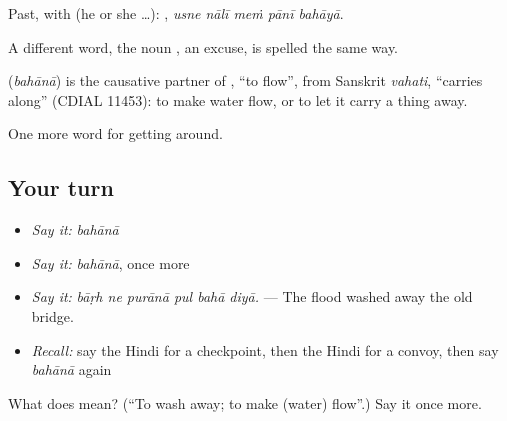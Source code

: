 Past, with  (he or she …):     , \emph{usne nālī meṁ pānī bahāyā}.

A different word, the noun , an excuse, is spelled the same way.

\begin{cousinweb}
\textbf{} (\emph{bahānā}) is the causative partner of , \textquotedblleft{}to flow\textquotedblright{}, from Sanskrit \emph{vahati}, \textquotedblleft{}carries along\textquotedblright{} (CDIAL 11453): to make water flow, or to let it carry a thing away.
\end{cousinweb}

\begin{grammarlens}[title={What you've built}]
One more word for getting around.
\end{grammarlens}

\subsection*{Your turn}
\begin{itemize}
\raggedright
  \item \emph{Say it:} \emph{bahānā}
  \item \emph{Say it:} \emph{bahānā}, once more
  \item \emph{Say it:} \emph{bāṛh ne purānā pul bahā diyā.} — The flood washed away the old bridge.
  \item \emph{Recall:} say the Hindi for a checkpoint, then the Hindi for a convoy, then say \emph{bahānā} again
\end{itemize}

\begin{tcolorbox}[breakable,colback=teal!4,colframe=teal!35!black,title={Before you move on}]
What does  mean? (\textquotedblleft{}To wash away; to make (water) flow\textquotedblright{}.) Say it once more.
\end{tcolorbox}
